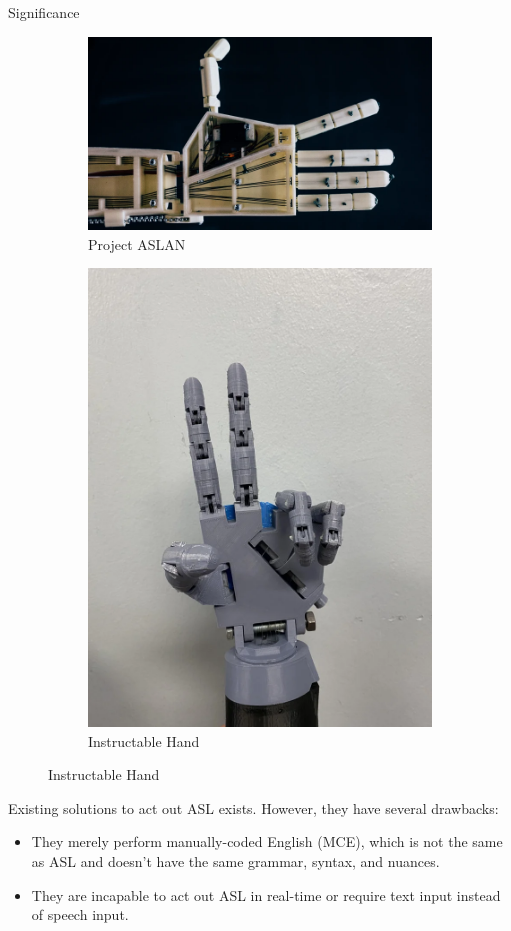 \documentclass[final, 20pt]{beamer}
\newlength{\colwidth}
\begin{document}
\begin{frame}[t]
\begin{columns}[t]
\begin{column}{\colwidth}
\begin{block}{Significance}
        \begin{figure}[ht]
          \centering
          \begin{subfigure}[b]{0.45\linewidth}
            \centering
            \includegraphics[width=\linewidth]{images/aslan.png}
            \caption{Project ASLAN}
            \label{fig:aslan}
          \end{subfigure}
          \begin{subfigure}[b]{0.45\linewidth}
            \centering
            \includegraphics[width=0.425\linewidth]{images/instructable-hand.png}
            \caption{Instructable Hand}
            \label{fig:instructable-hand}
          \end{subfigure}
        \end{figure}

        Existing solutions to act out ASL exists. However, they have several drawbacks:

        \begin{itemize}
          \item They merely perform manually-coded English (MCE), which is not the same as ASL and doesn't have the same grammar, syntax, and nuances.
          \item They are incapable to act out ASL in real-time or require text input instead of speech input.
        \end{itemize}


\end{block}
\end{column}
\end{columns}
\end{frame}
\end{document}
